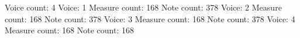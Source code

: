 Voice count: 4
Voice: 1
  Measure count: 168
  Note count: 378
Voice: 2
  Measure count: 168
  Note count: 378
Voice: 3
  Measure count: 168
  Note count: 378
Voice: 4
  Measure count: 168
  Note count: 168
